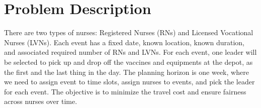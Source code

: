 
\section{Problem Description}
There are two types of nurses: Registered Nurses (RNs) and Licensed Vocational Nurses (LVNs). Each event has a fixed date, known location, known duration, and associated required number of RNs and LVNs. For each event, one leader will be selected to pick up and drop off the vaccines and equipments at the depot, as the first and the last thing in the day. The planning horizon is one week, where we need to assign event to time slots, assign nurses to events, and pick the leader for each event. The objective is to minimize the travel cost and ensure fairness across nurses over time. 

